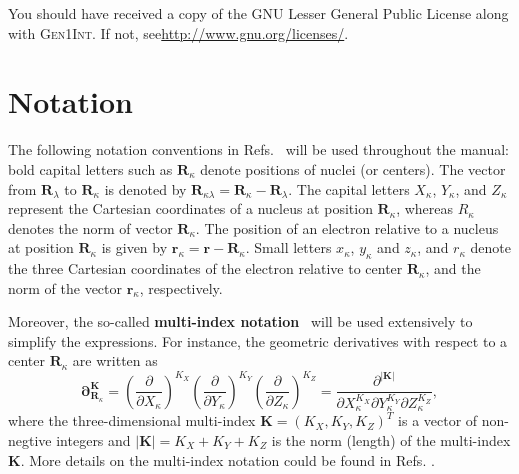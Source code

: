 \documentclass[a4paper,11pt,twoside,openright]{book}
\begin{document}
You should have received a copy of the GNU Lesser General Public License
along with \textsc{Gen1Int}. If not, see\linebreak \url{http://www.gnu.org/licenses/}.
\endgroup
\clearpage

\pagestyle{headings}


\tableofcontents

\chapter*{Notation}
\label{chap:notation}


The following notation conventions in Refs.~\cite{Gao:IJQC:2010,bgkrth-a,bgkr} will be used throughout
the manual: bold capital letters such as $\boldsymbol{R}_{\kappa}$ denote positions of nuclei (or centers).
The vector from $\boldsymbol{R}_{\lambda}$ to $\boldsymbol{R}_{\kappa}$ is denoted by
$\boldsymbol{R}_{\kappa\lambda}=\boldsymbol{R}_{\kappa}-\boldsymbol{R}_{\lambda}$.
The capital letters $X_{\kappa}$, $Y_{\kappa}$, and $Z_{\kappa}$ represent the Cartesian coordinates
of a nucleus at position $\boldsymbol{R}_{\kappa}$, whereas $R_{\kappa}$ denotes the norm
of vector $\boldsymbol{R}_{\kappa}$. The position of an electron relative to a nucleus at position
$\boldsymbol{R}_{\kappa}$ is given by $\boldsymbol{r}_{\kappa}=\boldsymbol{r}-\boldsymbol{R}_{\kappa}$.
Small letters $x_{\kappa}$, $y_{\kappa}$ and $z_{\kappa}$, and $r_{\kappa}$ denote the three
Cartesian coordinates of the electron relative to center $\boldsymbol{R}_{\kappa}$, and the
norm of the vector $\boldsymbol{r}_{\kappa}$, respectively.

Moreover, the so-called \textbf{multi-index notation}~\cite{Saint-Raymond:1991} will be used extensively to
simplify the expressions. For instance, the geometric derivatives with respect to a center
$\boldsymbol{R}_{\kappa}$ are written as
\begin{equation}
  \boldsymbol{\partial}_{\boldsymbol{R}_\kappa}^{\boldsymbol{K}}
  =\left(\frac{\partial}{\partial X_\kappa}\right)^{K_X}%
    \left(\frac{\partial}{\partial Y_\kappa}\right)^{K_Y}%
    \left(\frac{\partial}{\partial Z_\kappa}\right)^{K_Z}
  =\frac{\partial^{|\boldsymbol{K}|}}{\partial X_\kappa^{K_X}\partial Y_\kappa^{K_Y}\partial Z_\kappa^{K_Z}},
\end{equation}
where the three-dimensional multi-index $\boldsymbol{K}=(K_X,K_Y,K_Z)^{T}$ is a vector
of non-negtive integers and $|\boldsymbol{K}|=K_X+K_Y+K_Z$ is the norm (length) of the
multi-index $\boldsymbol{K}$. More details on the multi-index notation could be found in
Refs. \cite{bgkrth-a,Saint-Raymond:1991}.
\end{document}

